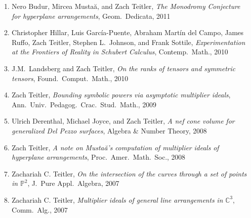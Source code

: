 \documentclass[12pt]{article}
\begin{document}
\begin{enumerate}
\item
Nero Budur, Mircea Musta\u{a}, and Zach Teitler,
\emph{The Monodromy Conjecture for hyperplane arrangements},
Geom.\ Dedicata,
2011

\item
Christopher Hillar, Luis Garc\'ia-Puente, Abraham Mart\'in del Campo, James Ruffo, Zach Teitler,
Stephen L.\ Johnson, and Frank Sottile,
\emph{Experimentation at the Frontiers of Reality in Schubert Calculus},
Contemp.\ Math.,
2010

\item J.M.~Landsberg and Zach Teitler,
\emph{On the ranks of tensors and symmetric tensors},
Found.\ Comput.\ Math.,
2010

\item Zach Teitler,
\emph{Bounding symbolic powers via asymptotic multiplier ideals},
Ann.\ Univ.\ Pedagog.\ Crac.\ Stud.\ Math.,
2009

\item Ulrich Derenthal, Michael Joyce, and Zach Teitler,
\emph{A nef cone volume for generalized Del Pezzo surfaces},
Algebra \& Number Theory,
2008

\item Zach Teitler,
\emph{A note on Musta\u{a}'s computation of multiplier ideals of hyperplane arrangements},
Proc.\ Amer.\ Math.\ Soc.,
2008

\item Zachariah C. Teitler,
\emph{On the intersection of the curves through a set of points in $\mathbb{P}^2$},
J.\ Pure Appl.\ Algebra,
2007

\item Zachariah C. Teitler,
\emph{Multiplier ideals of general line arrangements in $\mathbb{C}^3$},
Comm.\ Alg.,
2007

\end{enumerate}


%
%
\end{document}
